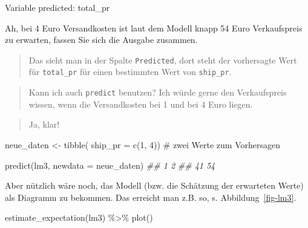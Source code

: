 \documentclass[
  letterpaper,
]{scrbook}
\newenvironment{Shaded}{\begin{snugshade}}{\end{snugshade}}
\newcommand{\AttributeTok}[1]{\textcolor[rgb]{0.40,0.45,0.13}{#1}}
\newcommand{\CommentTok}[1]{\textcolor[rgb]{0.37,0.37,0.37}{#1}}
\newcommand{\DecValTok}[1]{\textcolor[rgb]{0.68,0.00,0.00}{#1}}
\newcommand{\DocumentationTok}[1]{\textcolor[rgb]{0.37,0.37,0.37}{\textit{#1}}}
\newcommand{\FunctionTok}[1]{\textcolor[rgb]{0.28,0.35,0.67}{#1}}
\newcommand{\NormalTok}[1]{\textcolor[rgb]{0.00,0.23,0.31}{#1}}
\newcommand{\OtherTok}[1]{\textcolor[rgb]{0.00,0.23,0.31}{#1}}
\newcommand{\SpecialCharTok}[1]{\textcolor[rgb]{0.37,0.37,0.37}{#1}}
\theoremstyle{definition}
\theoremstyle{definition}
\theoremstyle{definition}
\theoremstyle{remark}
\begin{document}
Variable predicted: total\_pr

Ah, bei 4 Euro Versandkosten ist laut dem Modell knapp 54 Euro
Verkaufspreis zu erwarten, fassen Sie sich die Ausgabe zusammen.

\begin{quote}
{} Das sieht man in der Spalte \texttt{Predicted}, dort
steht der vorhersagte Wert für \texttt{total\_pr} für einen bestimmten
Wert von \texttt{ship\_pr}.
\end{quote}

\begin{quote}
{} Kann ich auch \texttt{predict} benutzen? Ich würde
gerne den Verkaufspreis wissen, wenn die Versandkosten bei 1 und bei 4
Euro liegen.
\end{quote}

\begin{quote}
{} Ja, klar!
\end{quote}

\begin{Shaded}
\begin{Highlighting}[]
\NormalTok{neue\_daten }\OtherTok{\textless{}{-}} \FunctionTok{tibble}\NormalTok{(}
  \AttributeTok{ship\_pr =} \FunctionTok{c}\NormalTok{(}\DecValTok{1}\NormalTok{, }\DecValTok{4}\NormalTok{)) }\CommentTok{\# zwei Werte zum Vorhersagen}
\end{Highlighting}
\end{Shaded}

\begin{Shaded}
\begin{Highlighting}[]
\FunctionTok{predict}\NormalTok{(lm3, }\AttributeTok{newdata =}\NormalTok{ neue\_daten)}
\DocumentationTok{\#\#  1  2 }
\DocumentationTok{\#\# 41 54}
\end{Highlighting}
\end{Shaded}

Aber nützlich wäre noch, das Modell (bzw. die Schätzung der erwarteten
Werte) als Diagramm zu bekommen. Das erreicht man z.B. so, s.
Abbildung~\ref{fig-lm3}.

\begin{Shaded}
\begin{Highlighting}[]
\FunctionTok{estimate\_expectation}\NormalTok{(lm3) }\SpecialCharTok{\%\textgreater{}\%} \FunctionTok{plot}\NormalTok{()}
\end{Highlighting}
\end{Shaded}
\end{document}
